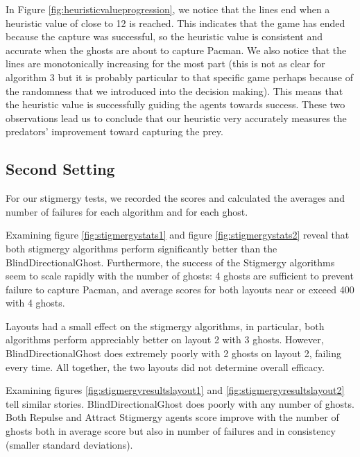 \documentclass[11pt]{article}
\begin{document}
\begin{multicols}{2}
\noindent In Figure \ref{fig:heuristicvalueprogression}, we notice that the lines end when a heuristic value of close to 12 is reached. This indicates that the game has ended because the capture was successful, so the heuristic value is consistent and accurate when the ghosts are about to capture Pacman. We also notice that the lines are monotonically increasing for the most part (this is not as clear for algorithm 3 but it is probably particular to that specific game perhaps because of the randomness that we introduced into the decision making). This means that the heuristic value is successfully guiding the agents towards success. These two observations lead us to conclude that our heuristic very accurately measures the predators' improvement toward capturing the prey. 

\subsection{Second Setting}

For our stigmergy tests, we recorded the scores and calculated the averages and number of failures for each algorithm and for each ghost. 

Examining figure \ref{fig:stigmergystats1} and figure \ref{fig:stigmergystats2} reveal that both stigmergy algorithms perform significantly better than the BlindDirectionalGhost.  Furthermore, the success of the Stigmergy algorithms seem to scale rapidly with the number of ghosts: 4 ghosts are sufficient to prevent failure to capture Pacman, and average scores for both layouts near or exceed 400 with 4 ghosts. 

Layouts had a small effect on the stigmergy algorithms, in particular, both algorithms perform appreciably better on layout 2 with 3 ghosts.  However, BlindDirectionalGhost does extremely poorly with 2 ghosts on layout 2, failing every time.  All together, the two layouts did not determine overall efficacy.

Examining figures \ref{fig:stigmergyresultslayout1} and \ref{fig:stigmergyresultslayout2} tell similar stories.  BlindDirectionalGhost does poorly with any number of ghosts.  Both Repulse and Attract Stigmergy agents score improve with the number of ghosts both in average score but also in number of failures and in consistency (smaller standard deviations).

\end{multicols}
\end{document}
